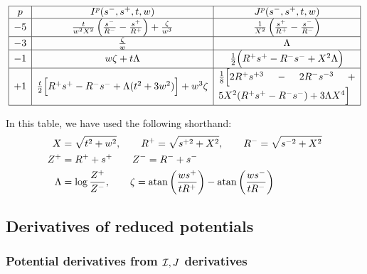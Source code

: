 \documentclass[letterpaper]{article}
\begin{document}
$$\begin{array}{|c|c|c|}\hline
p 
& 
I^p(s^-, s^+, t, w)
&
J^p(s^-, s^+, t, w)
\\\hline
-5 
&
\frac{t}{w^2 X^2}\left( \frac{s^-}{R^-} - \frac{s^+}{R^+} \right)
+\frac{\zeta}{w^3} 
&
\frac{1}{X^2}\left( \frac{s^+}{R^+} - \frac{s^-}{R^-} \right)
\\\hline
-3 
&
\frac{\zeta}{w}
&
\Lambda
\\\hline
-1 
&
w\zeta + t\Lambda
&
\frac{1}{2}\Big(R^+ s^+ - R^- s^- + X^2 \Lambda\Big)
\\\hline
+1 
&
\frac{t}{2}\Big[R^+ s^+ - R^- s^- + \Lambda(t^2 + 3w^2)\Big]
 + w^3 \zeta
&
\parbox{0.4\textwidth}{$
\frac{1}{8}\Big[2R^+ s^{+3} - 2R^- s^{-3} + 5X^2(R^+ s^+ - R^- s^-)
 + 3\Lambda X^4\Big]$}
\\\hline
\end{array}$$

In this table, we have used the following shorthand:
\begin{align*}
 X&=\sqrt{t^2 + w^2},
 \qquad
 R^+=\sqrt{s^{+2} + X^2},
 \qquad
 R^-=\sqrt{s^{-2} + X^2}
\\
 Z^+ &= R^+ + s^+ 
\qquad 
 Z^- = R^- + s^-
\\
 \Lambda &= \log\frac{Z^+}{Z^-}, \qquad 
 \zeta   = \mathop{\mathrm{atan}}\nolimits\left(\frac{w s^+}{tR^+}\right) - \mathop{\mathrm{atan}}\nolimits\left(\frac{w s^-}{tR^-}\right)
\end{align*}

\subsection{Derivatives of reduced potentials}

\subsubsection{Potential derivatives from $\mathcal{I},J$ derivatives}
\end{document}
